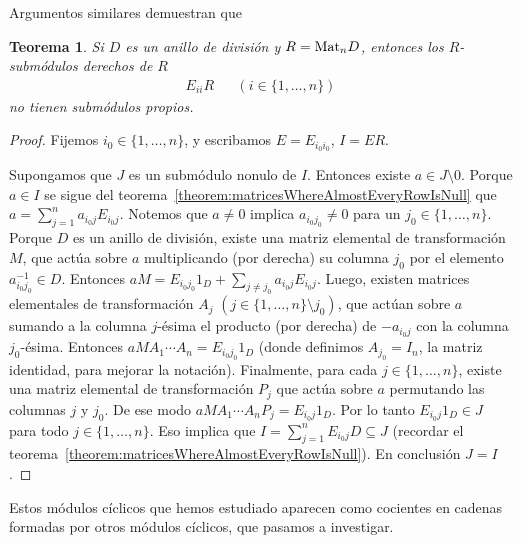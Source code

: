 \documentclass{report}
\newcommand{\Mat}{\textnormal{Mat}}
\newtheorem{theorem}{Teorema}
\begin{document}
  Argumentos similares demuestran que
  \begin{theorem}
    Si \(D\) es un anillo de división y \(R = \Mat_n D\), entonces los \(R\)-submódulos derechos de \(R\)
    \begin{align}
      E_{i i} R
      &&(i \in \{1, \dots, n\})
    \end{align}
    no tienen submódulos propios.
  \end{theorem}
  \begin{proof}
    Fijemos \(i_0 \in \{1, \dots, n\}\), y escribamos \(E = E_{i_0 i_0}\), \(I = E R\).

    Supongamos que \(J\) es un submódulo nonulo de \(I\).
    Entonces existe \(a \in J \setminus 0\).
    Porque \(a \in I\) se sigue del teorema~\ref{theorem:matricesWhereAlmostEveryRowIsNull} que \(a = \sum_{j = 1}^n a_{i_0 j} E_{i_0 j}\).
    Notemos que \(a \neq 0\) implica \(a_{i_0 j_0} \neq 0\) para un \(j_0 \in \{1, \dots, n\}\).
    Porque \(D\) es un anillo de división, existe una matriz elemental de transformación \(M\), que actúa sobre \(a\) multiplicando (por derecha) su columna \(j_0\) por el elemento \(a_{i_0 j_0}^{- 1} \in D\).
    Entonces \(a M = E_{i_0 j_0} 1_D + \sum_{j \neq j_0} a_{i_0 j} E_{i_0 j}\).
    Luego, existen matrices elementales de transformación \(A_j\) \((j \in \{1, \dots, n\} \setminus j_0)\), que actúan sobre \(a\) sumando a la columna \(j\)-ésima el producto (por derecha) de \(- a_{i_0 j}\) con la columna \(j_0\)-ésima.
    Entonces \(a M A_1 \cdots A_n = E_{i_0 j_0} 1_D\) (donde definimos \(A_{j_0} = I_n\), la matriz identidad, para mejorar la notación).
    Finalmente, para cada \(j \in \{1, \dots, n\}\), existe una matriz elemental de transformación \(P_j\) que actúa sobre \(a\) permutando las columnas \(j\) y \(j_0\).
    De ese modo \(a M A_1 \cdots A_n P_j = E_{i_0 j} 1_D\).
    Por lo tanto \(E_{i_0 j} 1_D \in J\) para todo \(j \in \{1, \dots, n\}\).
    Eso implica que \(I = \sum_{j = 1}^n E_{i_0 j} D \subseteq J\) (recordar el teorema~\ref{theorem:matricesWhereAlmostEveryRowIsNull}).
    En conclusión \(J = I\).
  \end{proof}

  Estos módulos cíclicos que hemos estudiado aparecen como cocientes en cadenas formadas por otros módulos cíclicos, que pasamos a investigar.
\end{document}
